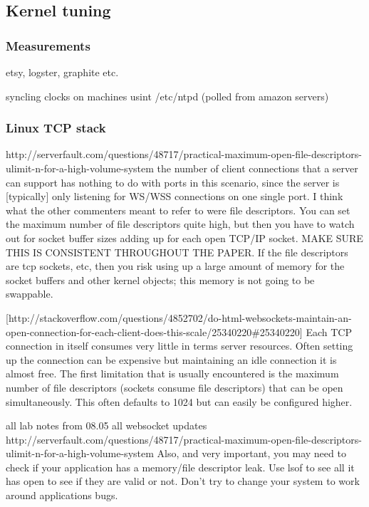 \documentclass{uvamscse}
\begin{document}
\subsection{Kernel tuning}\label{Kernel tuning}

\subsubsection{Measurements}
etsy, logster, graphite etc.

syncling clocks on machines usint /etc/ntpd (polled from amazon servers)

\subsubsection{Linux TCP stack}

http://serverfault.com/questions/48717/practical-maximum-open-file-descriptors-ulimit-n-for-a-high-volume-system
the number of client connections that a server can support has nothing to do with ports in this scenario, since the server is [typically] only listening for WS/WSS connections on one single port. I think what the other commenters meant to refer to were file descriptors. You can set the maximum number of file descriptors quite high, but then you have to watch out for socket buffer sizes adding up for each open TCP/IP socket.  MAKE SURE THIS IS CONSISTENT THROUGHOUT THE PAPER.
If the file descriptors are tcp sockets, etc, then you risk using up a large amount of memory for the socket buffers and other kernel objects; this memory is not going to be swappable.

[http://stackoverflow.com/questions/4852702/do-html-websockets-maintain-an-open-connection-for-each-client-does-this-scale/25340220\#25340220]
Each TCP connection in itself consumes very little in terms server resources. Often setting up the connection can be expensive but maintaining an idle connection it is almost free. The first limitation that is usually encountered is the maximum number of file descriptors (sockets consume file descriptors) that can be open simultaneously. This often defaults to 1024 but can easily be configured higher.

all lab notes from 08.05
all websocket updates
http://serverfault.com/questions/48717/practical-maximum-open-file-descriptors-ulimit-n-for-a-high-volume-system
Also, and very important, you may need to check if your application has a memory/file descriptor leak. Use lsof to see all it has open to see if they are valid or not. Don't try to change your system to work around applications bugs.
\end{document}
